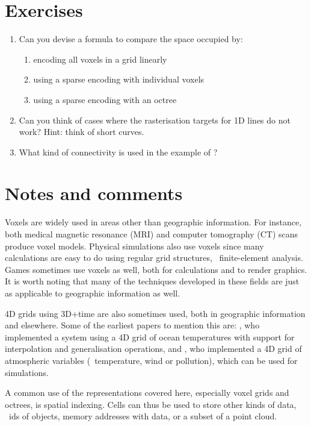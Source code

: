 %
\section{Exercises}

\begin{enumerate}
	\item Can you devise a formula to compare the space occupied by:
	\begin{enumerate}
		\item encoding all voxels in a grid linearly
		\item using a sparse encoding with individual voxels
		\item using a sparse encoding with an octree
	\end{enumerate}
	\item Can you think of cases where the rasterisation targets for 1D lines do not work? Hint: think of short curves.
	\item What kind of connectivity is used in the example of ?
\end{enumerate}



%
\section{Notes and comments}

Voxels are widely used in areas other than geographic information.
For instance, both medical magnetic resonance (MRI) and computer tomography (CT) scans produce voxel models.
Physical simulations also use voxels since many calculations are easy to do using regular grid structures, \eg\ finite-element analysis.
Games sometimes use voxels as well, both for calculations and to render graphics.
It is worth noting that many of the techniques developed in these fields are just as applicable to geographic information as well.

4D grids using 3D+time are also sometimes used, both in geographic information and elsewhere.
Some of the earliest papers to mention this are: \citet{Mason94}, who implemented a system using a 4D grid of ocean temperatures with support for interpolation and generalisation operations, and \citet{Bernard98}, who implemented a 4D grid of atmospheric variables (\eg\ temperature, wind or pollution), which can be used for simulations.

A common use of the representations covered here, especially voxel grids and octrees, is spatial indexing.
Cells can thus be used to store other kinds of data, \eg\ ids of objects, memory addresses with data, or a subset of a point cloud.

